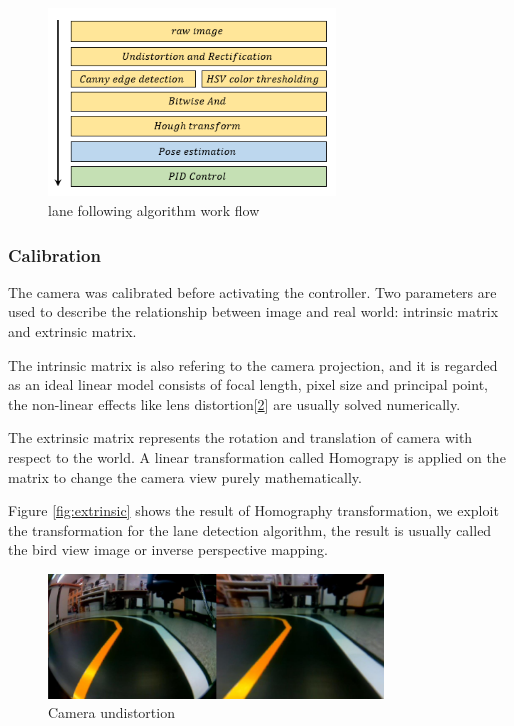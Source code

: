 \documentclass[conference]{IEEEtran}
\begin{document}
\begin{figure}
	\centering
	\includegraphics[width=3in]{img/lane_flow.png}
	\caption{lane following algorithm work flow}
	\label{fig:lane_following_flow}
\end{figure}

\subsubsection{Calibration}

The camera was calibrated before activating the controller. Two parameters are used to describe the relationship between image and real world: intrinsic matrix and extrinsic matrix.

The intrinsic matrix is also refering to the camera projection, and it is regarded as an ideal linear model consists of focal length, pixel size and principal point, the non-linear effects like lens distortion[\ref{fig:intrinsic}] are usually solved numerically.

The extrinsic matrix represents the rotation and translation of camera with respect to the world. A linear transformation called Homograpy is applied on  the matrix to change the camera view purely mathematically.

Figure \ref{fig:extrinsic} shows the result of Homography transformation, we exploit the transformation for the lane detection algorithm, the result is usually called the bird view image or inverse perspective mapping.

\begin{figure}
	\centering
	\includegraphics[width=3.5in]{img/intrinsic.png}
	\caption{Camera undistortion}
	\label{fig:intrinsic}
\end{figure}
\end{document}
